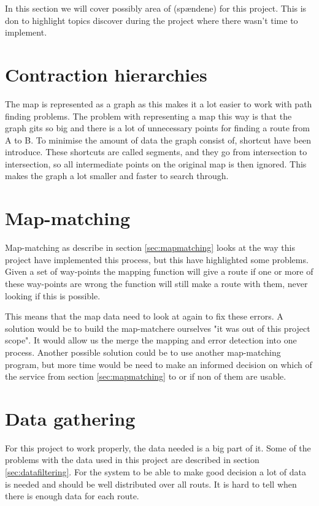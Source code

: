 In this section we will cover possibly area of (spændene) for this project. This is don to highlight topics discover during the project where there wasn't time to implement.
\section{Contraction hierarchies}\label{sec:future:contraction-hierarchies}
The map is represented as a graph as this makes it a lot easier to work with path finding problems. The problem with representing a map this way is that the graph gits so big and there is a lot of unnecessary points for finding a route from A to B. To minimise the amount of data the graph consist of, shortcut have been introduce. These shortcuts are called segments, and they go from intersection to intersection, so all intermediate points on the original map is then ignored. This makes the graph a lot smaller and faster to search through.

\section{Map-matching}\label{sec:future:map-matching}
Map-matching as describe in section \ref{sec:mapmatching} looks at the way this project have implemented this process, but this have highlighted some problems. Given a set of way-points the mapping function will give a route if one or more of these way-points are wrong the function will still make a route with them, never looking if this is possible.

This means that the map data need to look at again to fix these errors. A solution would be to build the map-matchere ourselves "it was out of this project scope". It would allow us the merge the mapping and error detection into one process. Another possible solution could be to use another map-matching program, but more time would be need to make an informed decision on which of the service from section \ref{sec:mapmatching} to or if non of them are usable.

\section{Data gathering}
For this project to work properly, the data needed is a big part of it. Some of the problems with the data used in this project are described in section \ref{sec:datafiltering}. For the system to be able to make good decision a lot of data is needed and should be well distributed over all routs. It is hard to tell when there is enough data for each route.

